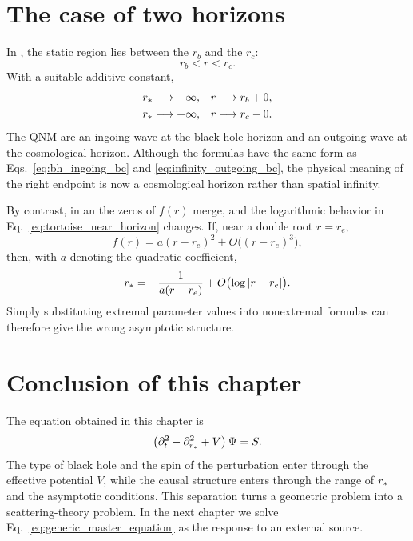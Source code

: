 \section{The case of two horizons}

In , the static region lies between the  $r_b$ and the  $r_c$:
\begin{equation}
r_b<r<r_c.
\end{equation}
With a suitable additive constant,
\begin{align}
r_*&\longrightarrow-\infty,
&&r\longrightarrow r_b+0,
\\
r_*&\longrightarrow+\infty,
&&r\longrightarrow r_c-0.
\end{align}
The QNM  are an ingoing wave at the black-hole horizon and an outgoing wave at the cosmological horizon. Although the formulas have the same form as Eqs.~\eqref{eq:bh_ingoing_bc} and \eqref{eq:infinity_outgoing_bc}, the physical meaning of the right endpoint is now a cosmological horizon rather than spatial infinity.

By contrast, in an  the zeros of $f(r)$ merge, and the logarithmic behavior in Eq.~\eqref{eq:tortoise_near_horizon} changes. If, near a double root $r=r_e$,
\begin{equation}
f(r)
=
a(r-r_e)^2
+O\bigl((r-r_e)^3\bigr),
\end{equation}
then, with $a$ denoting the quadratic coefficient,
\begin{equation}
r_*
=
-\frac{1}{a(r-r_e)}
+O\bigl(\log|r-r_e|\bigr).
\end{equation}
Simply substituting extremal parameter values into nonextremal formulas can therefore give the wrong asymptotic structure.

\section{Conclusion of this chapter}

The equation obtained in this chapter is
\begin{equation}
\left(
\partial_t^2
-\partial_{r_*}^2
+V
\right)\Psi
=
S.
\label{eq:generic_master_equation}
\end{equation}
The type of black hole and the spin of the perturbation enter through the effective potential $V$, while the causal structure enters through the range of $r_*$ and the asymptotic conditions. This separation turns a geometric problem into a scattering-theory problem. In the next chapter we solve Eq.~\eqref{eq:generic_master_equation} as the response to an external source.


